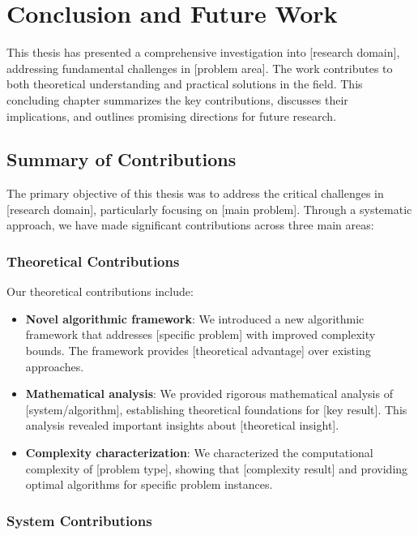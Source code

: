 \chapter{Conclusion and Future Work}
\label{chapter:conclusion}

This thesis has presented a comprehensive investigation into [research domain], addressing fundamental challenges in [problem area]. The work contributes to both theoretical understanding and practical solutions in the field. This concluding chapter summarizes the key contributions, discusses their implications, and outlines promising directions for future research.

\section{Summary of Contributions}

The primary objective of this thesis was to address the critical challenges in [research domain], particularly focusing on [main problem]. Through a systematic approach, we have made significant contributions across three main areas:

\subsection{Theoretical Contributions}

Our theoretical contributions include:

\begin{itemize}
    \item \textbf{Novel algorithmic framework}: We introduced a new algorithmic framework that addresses [specific problem] with improved complexity bounds. The framework provides [theoretical advantage] over existing approaches.
    
    \item \textbf{Mathematical analysis}: We provided rigorous mathematical analysis of [system/algorithm], establishing theoretical foundations for [key result]. This analysis revealed important insights about [theoretical insight].
    
    \item \textbf{Complexity characterization}: We characterized the computational complexity of [problem type], showing that [complexity result] and providing optimal algorithms for specific problem instances.
\end{itemize}

\subsection{System Contributions}

